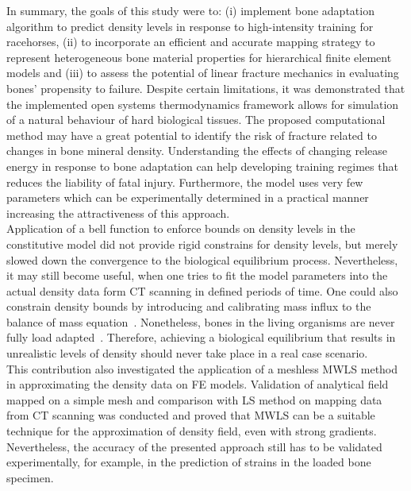 \documentclass[review]{elsarticle}
\numberwithin{equation}{section}
\begin{document}
In summary, the goals of this study were to: (i) implement bone adaptation algorithm to predict density levels in response to high-intensity training for racehorses, (ii) to incorporate an efficient and accurate mapping strategy to represent heterogeneous bone material properties for hierarchical finite element models and (iii) to assess the potential of linear fracture mechanics in evaluating bones' propensity to failure. 
Despite certain limitations, it was demonstrated that the implemented open systems thermodynamics framework allows for simulation of a natural behaviour of hard biological tissues. 
The proposed computational method may have a great potential to identify the risk of fracture related to changes in bone mineral density. 
Understanding the effects of changing release energy in response to bone adaptation can help developing training regimes that reduces the liability of fatal injury. 
Furthermore, the model uses very few parameters which can be experimentally determined in a practical manner increasing the attractiveness of this approach.\\ 

Application of a bell function to enforce bounds on density levels in the constitutive model did not provide rigid constrains for density levels, but merely slowed down the convergence to the biological equilibrium process. 
Nevertheless, it may still become useful, when one tries to fit the model parameters into the actual density data form CT scanning in defined periods of time. 
One could also constrain density bounds by introducing and calibrating mass influx to the balance of mass equation~\citep{sharma2013adaptive}. 
Nonetheless, bones in the living organisms are never fully load adapted~\citep{christen2014bone}. 
Therefore, achieving a biological equilibrium that results in unrealistic levels of density should never take place in a real case scenario. \\

This contribution also investigated the application of a meshless MWLS method in approximating the density data on FE models. Validation of analytical field mapped on a simple mesh and comparison with LS method on mapping data from CT scanning was conducted and proved that MWLS can be a suitable technique for the approximation of density field, even with strong gradients. 
Nevertheless, the accuracy of the presented approach still has to be validated experimentally, for example, in the prediction of strains in the loaded bone specimen.  \\
\end{document}
